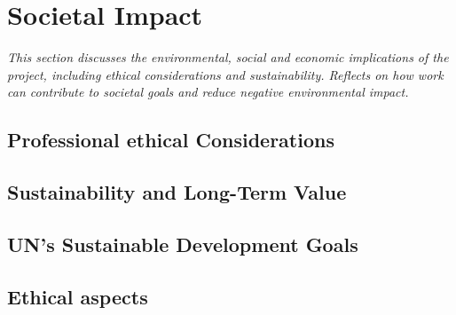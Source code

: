 \chapter{Societal Impact}

\begin{center}
    \textit{This section discusses the environmental, social and economic implications of the project, including ethical considerations and sustainability. Reflects on how work can contribute to societal goals and reduce negative environmental impact.}
\end{center}

\section{Professional ethical Considerations}

\section{Sustainability and Long-Term Value}

\section{UN’s Sustainable Development Goals}

\section{Ethical aspects}

